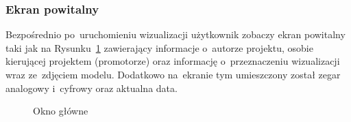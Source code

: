 \subsubsection{Ekran powitalny}
Bezpośrednio po~uruchomieniu wizualizacji użytkownik zobaczy ekran powitalny taki jak na Rysunku~\ref{vis1} zawierający informacje o~autorze projektu, osobie kierującej projektem (promotorze) oraz informację o~przeznaczeniu wizualizacji wraz ze~zdjęciem modelu. Dodatkowo na~ekranie tym umieszczony został zegar analogowy i~cyfrowy oraz aktualna data.
\begin{figure}[!htb]
\centering 		
\caption{Okno główne} 	
\label{vis1}
\end{figure}